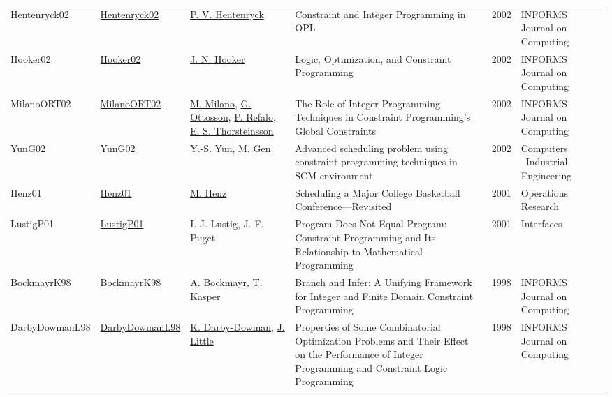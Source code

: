 {\begin{longtable}{p{2cm}p{2cm}p{5cm}p{10cm}rp{3cm}l}
Hentenryck02 & \href{http://dx.doi.org/10.1287/ijoc.14.4.345.2826}{Hentenryck02} & \hyperref[auth:a148]{P. V. Hentenryck} & Constraint and Integer Programming in OPL & 2002 & \cellcolor{red!20}INFORMS Journal on Computing & \cite{Hentenryck02}\\
Hooker02 & \href{http://dx.doi.org/10.1287/ijoc.14.4.295.2828}{Hooker02} & \hyperref[auth:a160]{J. N. Hooker} & Logic, Optimization, and Constraint Programming & 2002 & \cellcolor{red!20}INFORMS Journal on Computing & \cite{Hooker02}\\
MilanoORT02 & \href{http://dx.doi.org/10.1287/ijoc.14.4.387.2830}{MilanoORT02} & \hyperref[auth:a143]{M. Milano}, \hyperref[auth:a852]{G. Ottosson}, \hyperref[auth:a254]{P. Refalo}, \hyperref[auth:a874]{E. S. Thorsteinsson} & The Role of Integer Programming Techniques in Constraint Programming's Global Constraints & 2002 & \cellcolor{red!20}INFORMS Journal on Computing & \cite{MilanoORT02}\\
YunG02 & \href{http://dx.doi.org/10.1016/s0360-8352(02)00065-7}{YunG02} & \hyperref[auth:a1473]{Y.-S. Yun}, \hyperref[auth:a1474]{M. Gen} & Advanced scheduling problem using constraint programming techniques in SCM environment & 2002 & Computers \  Industrial Engineering & \cite{YunG02}\\
Henz01 & \href{http://dx.doi.org/10.1287/opre.49.1.163.11193}{Henz01} & \hyperref[auth:a1420]{M. Henz} & Scheduling a Major College Basketball Conference—Revisited & 2001 & \cellcolor{red!20}Operations Research & \cite{Henz01}\\
LustigP01 & \href{http://dx.doi.org/10.1287/inte.31.6.29.9647}{LustigP01} & I. J. Lustig, J.-F. Puget & Program Does Not Equal Program: Constraint Programming and Its Relationship to Mathematical Programming & 2001 & \cellcolor{red!20}Interfaces & \cite{LustigP01}\\
BockmayrK98 & \href{http://dx.doi.org/10.1287/ijoc.10.3.287}{BockmayrK98} & \hyperref[auth:a908]{A. Bockmayr}, \hyperref[auth:a1046]{T. Kasper} & Branch and Infer: A Unifying Framework for Integer and Finite Domain Constraint Programming & 1998 & \cellcolor{red!20}INFORMS Journal on Computing & \cite{BockmayrK98}\\
DarbyDowmanL98 & \href{http://dx.doi.org/10.1287/ijoc.10.3.276}{DarbyDowmanL98} & \hyperref[auth:a177]{K. Darby-Dowman}, \hyperref[auth:a178]{J. Little} & Properties of Some Combinatorial Optimization Problems and Their Effect on the Performance of Integer Programming and Constraint Logic Programming & 1998 & \cellcolor{red!20}INFORMS Journal on Computing & \cite{DarbyDowmanL98}\\

\end{longtable}}
